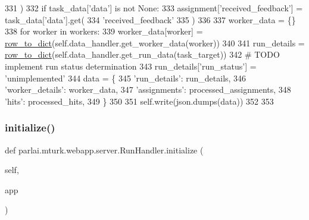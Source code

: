 \begin{DoxyCode}
331                 )
332                 \textcolor{keywordflow}{if} task\_data[\textcolor{stringliteral}{'data'}] \textcolor{keywordflow}{is} \textcolor{keywordflow}{not} \textcolor{keywordtype}{None}:
333                     assignment[\textcolor{stringliteral}{'received\_feedback'}] = task\_data[\textcolor{stringliteral}{'data'}].get(
334                         \textcolor{stringliteral}{'received\_feedback'}
335                     )
336 
337         worker\_data = \{\}
338         \textcolor{keywordflow}{for} worker \textcolor{keywordflow}{in} workers:
339             worker\_data[worker] = \hyperlink{namespaceparlai_1_1mturk_1_1webapp_1_1server_a92be47964fa33a4b6a14d4069d091c7d}{row\_to\_dict}(self.data\_handler.get\_worker\_data(worker))
340 
341         run\_details = \hyperlink{namespaceparlai_1_1mturk_1_1webapp_1_1server_a92be47964fa33a4b6a14d4069d091c7d}{row\_to\_dict}(self.data\_handler.get\_run\_data(task\_target))
342         \textcolor{comment}{# TODO implement run status determination}
343         run\_details[\textcolor{stringliteral}{'run\_status'}] = \textcolor{stringliteral}{'unimplemented'}
344         data = \{
345             \textcolor{stringliteral}{'run\_details'}: run\_details,
346             \textcolor{stringliteral}{'worker\_details'}: worker\_data,
347             \textcolor{stringliteral}{'assignments'}: processed\_assignments,
348             \textcolor{stringliteral}{'hits'}: processed\_hits,
349         \}
350 
351         self.write(json.dumps(data))
352 
353 
\end{DoxyCode}
\mbox{\label{classparlai_1_1mturk_1_1webapp_1_1server_1_1RunHandler_abec3206f51ca4edd33ce201ef4131581}} 
\subsubsection{\texorpdfstring{initialize()}{initialize()}}
{\footnotesize\ttfamily def parlai.\+mturk.\+webapp.\+server.\+Run\+Handler.\+initialize (\begin{DoxyParamCaption}\item[{}]{self,  }\item[{}]{app }\end{DoxyParamCaption})}



